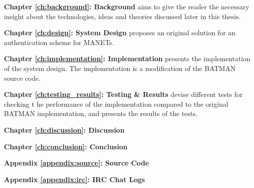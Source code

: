 \textbf{Chapter \ref{ch:background}: Background} aims to give the reader the
necessary insight about the technologies, ideas and theories discussed later in
this thesis.

\textbf{Chapter \ref{ch:design}: System Design} proposes an original solution
for an authentication scheme for \acp{MANET}.

\textbf{Chapter \ref{ch:implementation}: Implementation} presents the
implementation of the system design. The implementation is a modification of the
\ac{BATMAN} source code.

\textbf{Chapter \ref{ch:testing_results}: Testing \& Results} devise different
tests for checking t he performance of the implementation compared to the
original \ac{BATMAN} implementation, and presents the results of the tests.

\textbf{Chapter \ref{ch:discussion}: Discussion}

\textbf{Chapter \ref{ch:conclusion}: Conclusion}

\textbf{Appendix \ref{appendix:source}: Source Code}

\textbf{Appendix \ref{appendix:irc}: IRC Chat Logs}